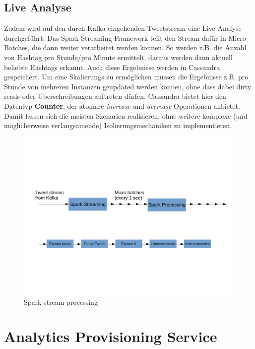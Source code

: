 \subsection*{Live Analyse}
Zudem wird auf den durch Kafka eingehenden Tweetstream eine Live Analyse durchgeführt.
Das Spark Streaming Framework teilt den Stream dafür in Micro-Batches, die dann weiter verarbeitet werden können.
So werden z.B. die Anzahl von Hashtag pro Stunde/pro Minute ermittelt, daraus werden dann aktuell beliebte Hashtags erkannt.
Auch diese Ergebnisse werden in Cassandra gespeichert.
Um eine Skalierungs zu ermöglichen müssen die Ergebnisse z.B. pro Stunde von mehreren Instanzen geupdated werden können, ohne dass dabei dirty reads oder Überschreibungen auftreten dürfen. Cassandra bietet hier den Datentyp \textbf{Counter}, der atomare \textit{increase} und \textit{decrease} Operationen anbietet. Damit lassen sich die meisten Szenarien realisieren, ohne weitere  komplexe (und möglicherweise verlangsamende) Isolierungsmechaniken zu implementieren.
\begin{figure}[htbp!]
\centering
\includegraphics[width=\linewidth]{pics/analytics/streamProcessing.pdf}
\caption{Spark stream processing}
\label{fig:streamProcessing}
\end{figure}




\section{Analytics Provisioning Service}

